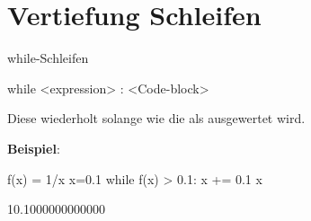 \documentclass[notes=hide,hyperref={dvipdfmx,pdfpagelabels=false}]{beamer}
\begin{document}
\section{Vertiefung Schleifen}

\begin{frame}[fragile]{while-Schleifen}
\begin{sagein}
while <expression> :
    <Code-block>
\end{sagein}
Diese wiederholt  solange wie die  als 
 ausgewertet wird.

\textbf{Beispiel}:
\begin{sagein}
f(x) = 1/x
x=0.1
while f(x) > 0.1:
    x += 0.1
x
\end{sagein}
\begin{sage}
 10.1000000000000
\end{sage}

\end{frame}




\end{document}
